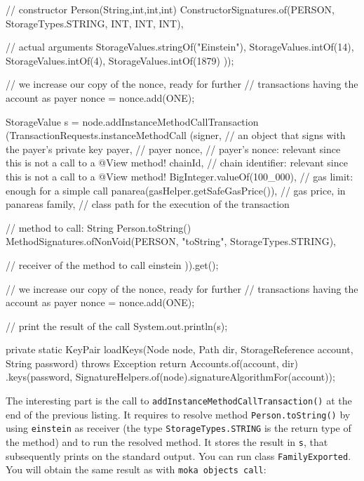 \begin{codebox}
\begin{javalst}
{{{      // constructor Person(String,int,int,int)
      ConstructorSignatures.of(PERSON, StorageTypes.STRING, INT, INT, INT),

      // actual arguments
      StorageValues.stringOf("Einstein"), StorageValues.intOf(14),
      StorageValues.intOf(4), StorageValues.intOf(1879)
      ));

      // we increase our copy of the nonce, ready for further
      // transactions having the account as payer
      nonce = nonce.add(ONE);

      StorageValue s = node.addInstanceMethodCallTransaction
      (TransactionRequests.instanceMethodCall
      (signer, // an object that signs with the payer's private key
      payer, // payer
      nonce, // payer's nonce: relevant since this is not a call to a @View method!
      chainId, // chain identifier: relevant since this is not a call to a @View method!
      BigInteger.valueOf(100_000), // gas limit: enough for a simple call
      panarea(gasHelper.getSafeGasPrice()), // gas price, in panareas
      family, // class path for the execution of the transaction

      // method to call: String Person.toString()
      MethodSignatures.ofNonVoid(PERSON, "toString", StorageTypes.STRING),

      // receiver of the method to call
      einstein
      )).get();

      // we increase our copy of the nonce, ready for further
      // transactions having the account as payer
      nonce = nonce.add(ONE);

      // print the result of the call
      System.out.println(s);
    }
  }

  private static KeyPair loadKeys(Node node, Path dir, StorageReference account, String password) throws Exception {
    return Accounts.of(account, dir)
    .keys(password, SignatureHelpers.of(node).signatureAlgorithmFor(account));
  }
}
\end{javalst}\end{codebox}
%
The interesting part is the call to \texttt{addInstanceMethodCallTransaction()}
at the end of the previous listing.
It requires to resolve method \texttt{Person.toString()} by using \texttt{einstein} as receiver
(the type \texttt{StorageTypes.STRING} is the return type of the method) and
to run the resolved method. It stores the result in
\texttt{s}, that subsequently prints on the standard output.
You can run class \texttt{FamilyExported}. You will obtain the same result as
with \texttt{moka objects call}:
%

